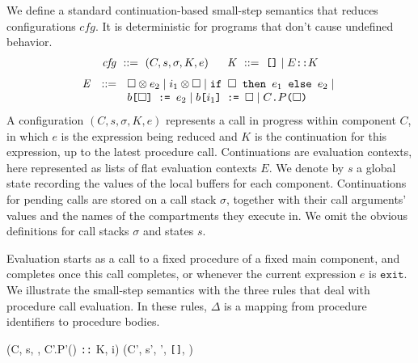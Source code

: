\documentclass[10pt, conference, compsocconf, letterpaper, times]{IEEEtran}
\renewcommand{\andalso}{\quad\;\;}
\begin{document}
We define a standard continuation-based small-step semantics that
reduces configurations $\mathit{cfg}$.  It is
deterministic for programs that don't cause undefined behavior.
\[
\begin{array}{l@{}l@{~~~~~}l@{}l}
  \mathit{cfg} \ \mathrel{::=}\ \;& (C, s, \sigma, K, e)
  &
    \mathit{K} \ \mathrel{::=}\ \;&
    \texttt{[]}
    \;|\;
    E \texttt{::} K
\end{array}
\]
\[
\begin{array}{l@{}l}
  \mathit{E} \ \ \mathrel{::=}\ \  \;&
    \square{} \otimes e_2
    \;|\;
    i_1 \otimes \square{}
    \;|\;
    \texttt{if }\square{}\texttt{ then }e_1\texttt{ else }e_2
    \;|\;
    \\ &
    b\texttt{[}\square{}\texttt{] := }e_2
    \;|\;
    b\texttt{[}i_1\texttt{] := }\square{}
    \;|\;
    C\texttt{.}P\texttt{(}\square{}\texttt{)}
\end{array}
\]
A configuration $(C, s, \sigma, K, e)$ represents a call in progress
within component $C$, in which $e$ is the expression being reduced and
$K$ is the continuation for this expression, up to the latest procedure
call.
Continuations are evaluation contexts, here represented as lists of
flat evaluation contexts $E$.
We denote by $s$ a global state recording the values of the local
buffers for each component.
Continuations for pending calls are stored on a call stack
$\sigma$, together with their call arguments' values and the names of
the compartments they execute in.
We omit the obvious definitions for call stacks $\sigma$ and states $s$.

Evaluation starts as a call to a fixed procedure of a fixed main
component, and completes once this call completes, or whenever the
current expression $e$ is $\texttt{exit}$.
We illustrate the small-step semantics with the three rules that deal
with procedure call evaluation.
In these rules, $\Delta$ is a mapping from procedure identifiers to
procedure bodies.

\infrule[]
  {s' = s[C',0,0 \mapsto i] \andalso \sigma' = (C,s[C,0,0],K) \texttt{::} \sigma }
  {\Delta \vdash (C,  s, \sigma, C'.P'(\square) \texttt{::} K, i) \rightarrow
   (C', s', \sigma', \texttt{[]}, \Delta[C',P'])}
\end{document}
